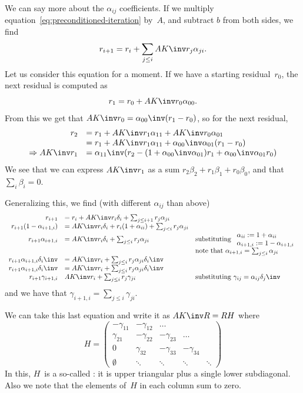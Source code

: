 We can say more about the $\alpha_{ij}$ coefficients.
If we multiply equation~\eqref{eq:preconditioned-iteration} by~$A$,
and subtract $b$ from both sides,
we find
\begin{equation}
  r_{i+1} = r_i+\sum_{j\leq i}AK\inv r_j\alpha_{ji}.
  \label{eq:general-r-update}
\end{equation}
Let us consider this equation for a moment. If we have a starting
residual~$r_0$, the next residual is computed as
\[ r_1=r_0+AK\inv r_0\alpha_{00}. \]
From this we get that $AK\inv r_0 = \alpha_{00}\inv(r_1-r_0)$, so
for the next residual,
\[
\begin{array}{rl}
  r_2&=r_1+AK\inv r_1\alpha_{11}+AK\inv r_0\alpha_{01}\\
  &=r_1+AK\inv r_1\alpha_{11}+\alpha_{00}\inv\alpha_{01}(r_1-r_0)\\
  \Rightarrow AK\inv r_1&=\alpha_{11}\inv
  (r_2-(1+\alpha_{00}\inv\alpha_{01})r_1+\alpha_{00}\inv\alpha_{01}r_0)
\end{array}
\]
We see that we can express $AK\inv r_1$ as a sum
$r_2\beta_2+r_1\beta_1+r_0\beta_0$, and that $\sum_i\beta_i=0$. 

Generalizing this, we find (with different $\alpha_{ij}$ than above)
\[ 
\begin{array}{rll}
  r_{i+1}&=r_i+AK\inv r_i\delta_i+\sum_{j\leq i+1}r_j\alpha_{ji}\\
  r_{i+1}(1-\alpha_{i+1,i})&=AK\inv r_i\delta_i +r_i(1+\alpha_{ii})
      +\sum_{j< i} r_j\alpha_{ji}\\
  r_{i+1}\alpha_{i+1,i}&=AK\inv r_i\delta_i +
      \sum_{j\leq i}r_j\alpha_{ji}
      &\vtop{
        \hbox{substituting $\begin{array}{ll}\alpha_{ii}:=1+\alpha_{ii}\\
        \alpha_{i+1,i}:=1-\alpha_{i+1,i}\end{array}$}
        \hbox{note that $\alpha_{i+1,i}=\sum_{j\leq i}\alpha_{ji}$}
        }\\
  r_{i+1}\alpha_{i+1,i}\delta_i\inv&=AK\inv r_i +\sum_{j\leq i}
  r_j\alpha_{ji}\delta_i\inv\\  
  r_{i+1}\alpha_{i+1,i}\delta_i\inv&=AK\inv r_i +\sum_{j\leq i}
      r_j\alpha_{ji}\delta_i\inv\\
  r_{i+1}\gamma_{i+1,i}&AK\inv r_i+\sum_{j\leq i} r_j\gamma_{ji}
      &\hbox{substituting $\gamma_{ij}=\alpha_{ij}\delta_j\inv$}
\end{array}
\]
and we have that $\gamma_{i+1,i}=\sum_{j\leq i}\gamma_{ji}$.

We can take this last equation and write it as $AK\inv R=RH$ where
\[ H=
\begin{pmatrix}
  -\gamma_{11}&-\gamma_{12}&\ldots\\
  \gamma_{21}&-\gamma_{22}&-\gamma_{23}&\ldots\\
  0&\gamma_{32}&-\gamma_{33}&-\gamma_{34}\\
  \emptyset&\ddots&\ddots&\ddots&\ddots
\end{pmatrix}
\]
In this, $H$~is a so-called : it is upper
triangular plus a single lower subdiagonal. Also we note that the
elements of~$H$ in each column sum to zero.

